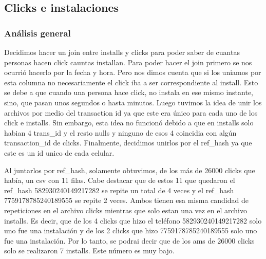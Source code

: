 \documentclass[a4paper, 12pt]{article}
\newcommand\tab[1][1cm]{\hspace*{#1}}
\begin{document}
\subsection{Clicks e instalaciones}
	\subsubsection{Análisis general}
	\tab Decidimos hacer un join entre installs y clicks para poder saber de cuantas personas hacen click cauntas installan. Para poder hacer el join primero se nos ocurrió hacerlo por la fecha y hora. Pero nos dimos cuenta que si los uniamos por esta columna no necesariamente el click iba a ser correspondiente al install. Esto se debe a que cuando una persona hace click, no instala en ese mismo instante, sino, que pasan unos segundos o hasta minutos. Luego tuvimos la idea de unir los archivos por medio del transaction id ya que este era único para cada uno de los click e installs. Sin embargo, esta idea no funcionó debido a que en installs solo habian 4 trans\_id y el resto nulls y ninguno de esos 4 coincidia con algún transaction\_id de clicks. Finalmente, decidimos unirlos por el ref\_hash ya que este es un id unico de cada celular.
	
	\tab Al juntarlos por ref\_hash, solamente obtuvimos, de los más de 26000 clicks que había, un csv con 11 filas. Cabe destacar que de estos 11 que quedaron el ref\_hash 582930240149217282 se repite un total de 4 veces y el ref\_hash 7759178785240189555 se repite 2 veces. Ambos tienen esa misma candidad de repeticiones en el archivo clicks mientras que solo estan una vez en el archivo installs. Es decir, que de los 4 clicks que hizo el teléfono 582930240149217282 solo uno fue una instalación y de los 2 clicks que hizo 7759178785240189555 solo uno fue una instalación. Por lo tanto, se podrai decir que de los ams de 26000 clicks solo se realizaron 7 installs. Este número es muy bajo.
	
\end{document}
